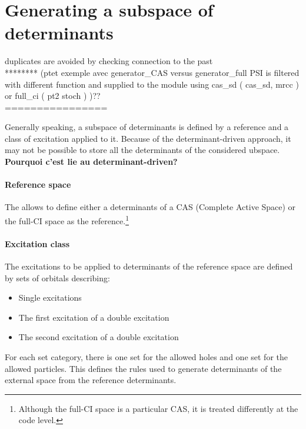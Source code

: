 \section{Generating a subspace of determinants}
\alert{
duplicates are avoided by checking connection to the past \\
******** (ptet exemple avec generator\_CAS versus generator\_full PSI is filtered with different function and supplied to the module using cas\_sd ( cas\_sd, mrcc ) or full\_ci ( pt2 stoch ) )?? \\
================
}

Generally speaking, a subspace of determinants is defined by a reference and a class of excitation applied to it.
\alert{
Because of the determinant-driven approach, it may not be possible to store all the determinants of the considered ubspace. \textbf{Pourquoi c'est lie au determinant-driven?}
}



\paragraph{Reference space}
The \QP allows to define either a determinants of a CAS (Complete Active Space) or the full-CI space as the reference.\footnote{Although the full-CI space is a particular CAS, it is treated differently at the code level.}

\paragraph{Excitation class}
The excitations to be applied to determinants of the reference space are defined by sets of orbitals describing:
\begin{itemize}
\item
Single excitations
\item
The first excitation of a double excitation
\item
The second excitation of a double excitation
\end{itemize}
For each set category, there is one set for the allowed holes and one set for the allowed particles.
This defines the rules used to generate determinants of the external space from the reference determinants.

